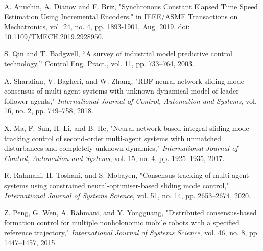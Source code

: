 \documentclass[journal,onecolumn]{IEEEtran}
\begin{document}
\begin{thebibliography}{99}
    A. Anuchin, A. Dianov and F. Briz, "Synchronous Constant Elapsed Time Speed Estimation Using Incremental Encoders," in IEEE/ASME Transactions on Mechatronics, vol. 24, no. 4, pp. 1893-1901, Aug. 2019, doi: 10.1109/TMECH.2019.2928950.

    S. Qin and T. Badgwell, “A survey of industrial model predictive control
    technology,” Control Eng. Pract., vol. 11, pp. 733–764, 2003.

    A. Sharafian, V. Bagheri, and W. Zhang, "RBF neural network sliding mode consensus of multi-agent systems with unknown dynamical model of leader-follower agents," \textit{International Journal of Control, Automation and Systems}, vol. 16, no. 2, pp. 749–758, 2018.

    X. Ma, F. Sun, H. Li, and B. He, "Neural-network-based integral sliding-mode tracking control of second-order multi-agent systems with unmatched disturbances and completely unknown dynamics," \textit{International Journal of Control, Automation and Systems}, vol. 15, no. 4, pp. 1925–1935, 2017.
    

    R. Rahmani, H. Toshani, and S. Mobayen, "Consensus tracking of multi-agent systems using constrained neural-optimiser-based sliding mode control," \textit{International Journal of Systems Science}, vol. 51, no. 14, pp. 2653–2674, 2020.

    Z. Peng, G. Wen, A. Rahmani, and Y. Yongguang, "Distributed consensus-based formation control for multiple nonholonomic mobile robots with a specified reference trajectory," \textit{International Journal of Systems Science}, vol. 46, no. 8, pp. 1447–1457, 2015.
    
    \end{thebibliography}
    
\end{document}

